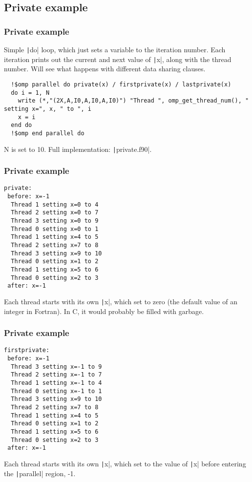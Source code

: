 \documentclass{beamer}
\begin{document}
\subsection{Private example}
\begin{frame}[fragile]
\frametitle{Private example}
Simple \texttt|do| loop, which just sets a variable to the iteration number.
Each iteration prints out the current and next value of \texttt|x|, along with the thread number.
Will see what happens with different data sharing clauses.

\begin{verbatim}
  !$omp parallel do private(x) / firstprivate(x) / lastprivate(x)
  do i = 1, N
    write (*,"(2X,A,I0,A,I0,A,I0)") "Thread ", omp_get_thread_num(), " setting x=", x, " to ", i
    x = i
  end do
  !$omp end parallel do
\end{verbatim}
N is set to 10.
Full implementation: \texttt|private.f90|.
\end{frame}

\begin{frame}[fragile]
\frametitle{Private example}
\begin{verbatim}
private:
 before: x=-1
  Thread 1 setting x=0 to 4
  Thread 2 setting x=0 to 7
  Thread 3 setting x=0 to 9
  Thread 0 setting x=0 to 1
  Thread 1 setting x=4 to 5
  Thread 2 setting x=7 to 8
  Thread 3 setting x=9 to 10
  Thread 0 setting x=1 to 2
  Thread 1 setting x=5 to 6
  Thread 0 setting x=2 to 3
 after: x=-1
\end{verbatim}
Each thread starts with its own \texttt|x|, which set to zero (the default value of an integer in Fortran).
In C, it would probably be filled with garbage.
\end{frame}

\begin{frame}[fragile]
\frametitle{Private example}
\begin{verbatim}
firstprivate:
 before: x=-1
  Thread 3 setting x=-1 to 9
  Thread 2 setting x=-1 to 7
  Thread 1 setting x=-1 to 4
  Thread 0 setting x=-1 to 1
  Thread 3 setting x=9 to 10
  Thread 2 setting x=7 to 8
  Thread 1 setting x=4 to 5
  Thread 0 setting x=1 to 2
  Thread 1 setting x=5 to 6
  Thread 0 setting x=2 to 3
 after: x=-1
\end{verbatim}
Each thread starts with its own \texttt|x|, which set to the value of \texttt|x| before entering the \texttt|parallel| region, -1.
\end{frame}
\end{document}
